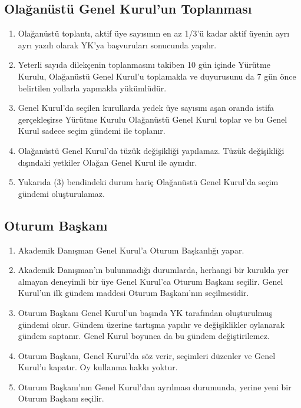 \documentclass[11pt,a4paper]{article}
\begin{document}
\subsection{Olağanüstü Genel Kurul'un Toplanması}
\begin{enumerate}
    \item Olağanüstü toplantı, aktif üye sayısının en az 1/3’ü kadar aktif üyenin ayrı ayrı yazılı olarak YK’ya başvuruları sonucunda yapılır.
    \item Yeterli sayıda dilekçenin toplanmasını takiben 10 gün içinde Yürütme Kurulu, Olağanüstü Genel Kurul’u toplamakla ve duyurusunu da 7 gün önce belirtilen yollarla yapmakla yükümlüdür.
    \item Genel Kurul’da seçilen kurullarda yedek üye sayısını aşan oranda istifa gerçekleşirse Yürütme Kurulu Olağanüstü Genel Kurul toplar ve bu Genel Kurul sadece seçim gündemi ile toplanır.
    \item Olağanüstü Genel Kurul’da tüzük değişikliği yapılamaz. Tüzük değişikliği dışındaki yetkiler Olağan Genel Kurul ile aynıdır.
    \item Yukarıda (3) bendindeki durum hariç Olağanüstü Genel Kurul’da seçim gündemi oluşturulamaz.
\end{enumerate}

\subsection{Oturum Başkanı}
\begin{enumerate}
    \item Akademik Danışman Genel Kurul’a Oturum Başkanlığı yapar.
    \item Akademik Danışman’ın bulunmadığı durumlarda, herhangi bir kurulda yer almayan deneyimli bir üye Genel Kurul’ca Oturum Başkanı seçilir. Genel Kurul’un ilk gündem maddesi Oturum Başkanı’nın seçilmesidir.
    \item Oturum Başkanı Genel Kurul’un başında YK tarafından oluşturulmuş gündemi okur. Gündem üzerine tartışma yapılır ve değişiklikler oylanarak gündem saptanır. Genel Kurul boyunca da bu gündem değiştirilemez.
    \item Oturum Başkanı, Genel Kurul’da söz verir, seçimleri düzenler ve Genel Kurul’u kapatır. Oy kullanma hakkı yoktur.
    \item Oturum Başkanı’nın Genel Kurul’dan ayrılması durumunda, yerine yeni bir Oturum Başkanı seçilir.
\end{enumerate}
\end{document}
